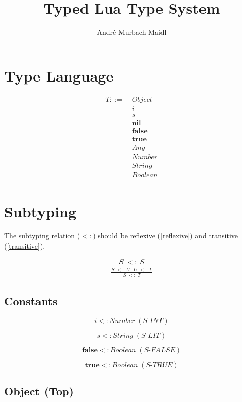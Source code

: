 \documentclass[12pt]{article}
\title{Typed Lua Type System}
\author{André Murbach Maidl}
\begin{document}
\maketitle

\section{Type Language}

\begin{align*}
T ::= \; & Object\\
& i\\
& s\\
& \textbf{nil}\\
& \textbf{false}\\
& \textbf{true}\\
& Any\\
& Number\\
& String\\
& Boolean\\
\end{align*}

\section{Subtyping}

The subtyping relation ($<:$) should be reflexive (\ref{reflexive})
and transitive (\ref{transitive}).

\begin{align}
\label{reflexive}
S \; <: \; S
\end{align}
\begin{align}
\label{transitive}
\frac{S \; <: \; U \;\;\; U\;  <: \; T}{S \; <: \; T}
\end{align}

\subsection{Constants}

\[
i <: Number \; (\textit{S-INT})
\]

\[
s <: String \; (\textit{S-LIT})
\]

\[
\textbf{false} <: Boolean \; (\textit{S-FALSE})
\]

\[
\textbf{true} <: Boolean \; (\textit{S-TRUE})
\]

\subsection{Object (Top)}
\end{document}
